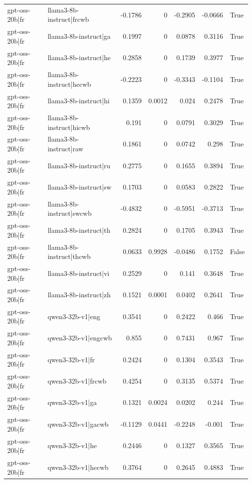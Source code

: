 \begin{table}
\begin{tabular}{l l r r r r l}
gpt-oss-20b|fr & llama3-8b-instruct|frcwb & -0.1786 & 0 & -0.2905 & -0.0666 & True \\
gpt-oss-20b|fr & llama3-8b-instruct|ga & 0.1997 & 0 & 0.0878 & 0.3116 & True \\
gpt-oss-20b|fr & llama3-8b-instruct|he & 0.2858 & 0 & 0.1739 & 0.3977 & True \\
gpt-oss-20b|fr & llama3-8b-instruct|hecwb & -0.2223 & 0 & -0.3343 & -0.1104 & True \\
gpt-oss-20b|fr & llama3-8b-instruct|hi & 0.1359 & 0.0012 & 0.024 & 0.2478 & True \\
gpt-oss-20b|fr & llama3-8b-instruct|hicwb & 0.191 & 0 & 0.0791 & 0.3029 & True \\
gpt-oss-20b|fr & llama3-8b-instruct|raw & 0.1861 & 0 & 0.0742 & 0.298 & True \\
gpt-oss-20b|fr & llama3-8b-instruct|ru & 0.2775 & 0 & 0.1655 & 0.3894 & True \\
gpt-oss-20b|fr & llama3-8b-instruct|sw & 0.1703 & 0 & 0.0583 & 0.2822 & True \\
gpt-oss-20b|fr & llama3-8b-instruct|swcwb & -0.4832 & 0 & -0.5951 & -0.3713 & True \\
gpt-oss-20b|fr & llama3-8b-instruct|th & 0.2824 & 0 & 0.1705 & 0.3943 & True \\
gpt-oss-20b|fr & llama3-8b-instruct|thcwb & 0.0633 & 0.9928 & -0.0486 & 0.1752 & False \\
gpt-oss-20b|fr & llama3-8b-instruct|vi & 0.2529 & 0 & 0.141 & 0.3648 & True \\
gpt-oss-20b|fr & llama3-8b-instruct|zh & 0.1521 & 0.0001 & 0.0402 & 0.2641 & True \\
gpt-oss-20b|fr & qwen3-32b-v1|eng & 0.3541 & 0 & 0.2422 & 0.466 & True \\
gpt-oss-20b|fr & qwen3-32b-v1|engcwb & 0.855 & 0 & 0.7431 & 0.967 & True \\
gpt-oss-20b|fr & qwen3-32b-v1|fr & 0.2424 & 0 & 0.1304 & 0.3543 & True \\
gpt-oss-20b|fr & qwen3-32b-v1|frcwb & 0.4254 & 0 & 0.3135 & 0.5374 & True \\
gpt-oss-20b|fr & qwen3-32b-v1|ga & 0.1321 & 0.0024 & 0.0202 & 0.244 & True \\
gpt-oss-20b|fr & qwen3-32b-v1|gacwb & -0.1129 & 0.0441 & -0.2248 & -0.001 & True \\
gpt-oss-20b|fr & qwen3-32b-v1|he & 0.2446 & 0 & 0.1327 & 0.3565 & True \\
gpt-oss-20b|fr & qwen3-32b-v1|hecwb & 0.3764 & 0 & 0.2645 & 0.4883 & True \\

\end{tabular}
\end{table}

